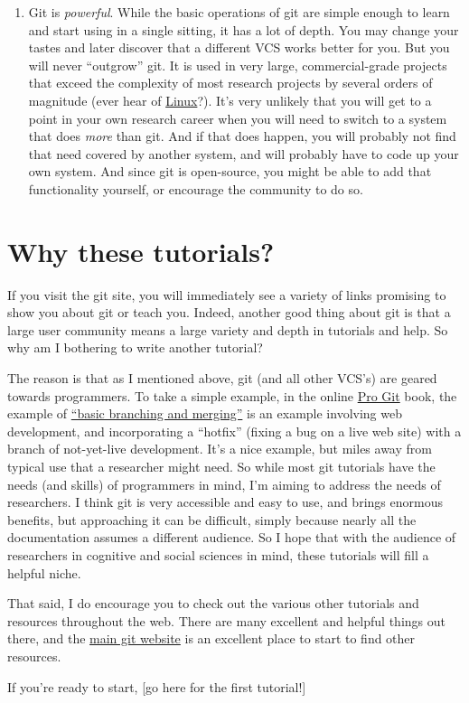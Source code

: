 \documentclass{article}
\begin{document}
\begin{enumerate}
\item Git is \emph{powerful}. While the basic operations of git are simple enough to learn and start using in a single sitting, it has a lot of depth. You may change your tastes and later discover that a different VCS works better for you. But you will never ``outgrow'' git. It is used in very large, commercial-grade projects that exceed the complexity of most research projects by several orders of magnitude (ever hear of \href{http://en.wikipedia.org/wiki/Linux}{Linux}?). It's very unlikely that you will get to a point in your own research career when you will need to switch to a system that does \emph{more} than git.  And if that does happen, you will probably not find that need covered by another system, and will probably have to code up your own system. And since git is open-source, you might be able to add that functionality yourself, or encourage the community to do so.
\end{enumerate}
\section{Why these tutorials?}
\label{sec-5}

If you visit the git site, you will immediately see a variety of links promising to show you about git or teach you. Indeed, another good thing about git is that a large user community means a large variety and depth in tutorials and help. So why am I bothering to write another tutorial?

The reason is that as I mentioned above, git (and all other VCS's) are geared towards programmers. To take a simple example, in the online \href{http://git-scm.com/doc}{Pro Git} book, the example of \href{http://git-scm.com/book/en/Git-Branching-Basic-Branching-and-Merging}{``basic branching and merging''} is an example involving web development, and incorporating a ``hotfix'' (fixing a bug on a live web site) with a branch of not-yet-live development. It's a nice example, but miles away from typical use that a researcher might need. So while most git tutorials have the needs (and skills) of programmers in mind, I'm aiming to address the needs of researchers.  I think git is very accessible and easy to use, and brings enormous benefits, but approaching it can be difficult, simply because nearly all the documentation assumes a different audience.  So I hope that with the audience of researchers in cognitive and social sciences in mind, these tutorials will fill a helpful niche.

That said, I do encourage you to check out the various other tutorials and resources throughout the web.  There are many excellent and helpful things out there, and the \href{http://git-scm.com/}{main git website} is an excellent place to start to find other resources.

\vspace{.5in}
If you're ready to start, [go here for the first tutorial!]
\end{document}

